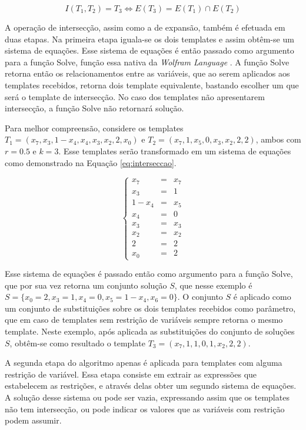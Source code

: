 \begin{equation}
I(T_1,T_2)=T_3 \Leftrightarrow E(T_3) = E(T_1) \cap E(T_2)
\end{equation}

A operação de intersecção, assim como a de expansão, também é efetuada em duas etapas. Na primeira etapa iguala-se os dois templates e assim obtêm-se um sistema de equações. Esse sistema de equações é então passado como argumento para a função Solve, função essa nativa da \textit{Wolfram Language} \cite{woframMathematica10}. A função Solve retorna então os relacionamentos entre as variáveis, que ao serem aplicados aos templates recebidos, retorna dois template equivalente, bastando escolher um que será o template de intersecção. No caso dos templates não apresentarem intersecção, a função Solve não retornará solução.

Para melhor compreensão, considere os templates $T_1 = (x_7,x_3,1-x_4,x_4,x_3,x_2,2,x_0)$ e $T_2 = (x_7,1,x_5,0,x_3,x_2,2,2)$, ambos com $r=0.5$ e $k=3$. Esse templates serão transformado em um sistema de equações como demonstrado na Equação \ref{eq:interseccao}.

\begin{equation}
\left\{\begin{matrix}
x_7   & = & x_7 \\ 
x_3   & = & 1 \\ 
1-x_4 & = & x_5    \\ 
x_4   & = & 0    \\ 
x_3   & = & x_3    \\ 
x_2   & = & x_2   \\ 
2     & = & 2   \\ 
x_0   & = & 2
\end{matrix}\right.
\label{eq:interseccao}
\end{equation}

Esse sistema de equações é passado então como argumento para a função Solve, que por sua vez retorna um conjunto solução $S$, que nesse exemplo é $S = \{x_0 = 2, x_3 = 1, x_4 = 0, x_5 = 1 - x_4, x_6 = 0\}$. O conjunto $S$ é aplicado como um conjunto de substituições sobre os dois templates recebidos como parâmetro, que em caso de templates sem restrição de variáveis sempre retorna o mesmo template. Neste exemplo, após aplicada as substituições do conjunto de soluções $S$, obtêm-se como resultado o template $T_3 = (x_7, 1, 1, 0, 1, x_2, 2, 2)$.

A segunda etapa do algoritmo apenas é aplicada para templates com alguma restrição de variável. Essa etapa consiste em extrair as expressões que estabelecem as restrições, e através delas obter um segundo sistema de equações. A solução desse sistema ou pode ser vazia, expressando assim que os templates não tem intersecção, ou pode indicar os valores que as variáveis com restrição podem assumir.

